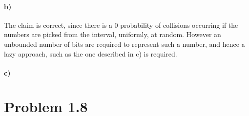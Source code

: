 \documentclass[12pt]{article}
\begin{document}
\paragraph{b)} The claim is correct, since there is a 0 probability of collisions occurring if the numbers are picked from the interval, uniformly, at random. However an unbounded number of bits are required to represent such a number, and hence a lazy approach, such as the one described in c) is required.

\paragraph{c)} 


\section*{Problem 1.8}
\end{document}
